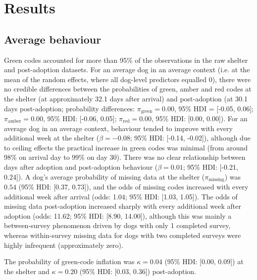 \documentclass[12pt]{article}
\begin{document}
\section{Results}

\subsection{Average behaviour}
Green codes accounted for more than 95\% of the observations in the raw shelter and post-adoption datasets. For an average dog in an average context (i.e. at the mean of the random effects, where all dog-level predictors equalled 0), there were no credible differences between the probabilities of green, amber and red codes at the shelter (at approximately 32.1 days after arrival) and post-adoption (at 30.1 days post-adoption; probability differences: $\pi_{\text{green}} = 0.00$, 95\% HDI = [-0.05, 0.06]; $\pi_{\text{amber}} = 0.00$, 95\% HDI: [-0.06, 0.05]; $\pi_{\text{red}} = 0.00$, 95\% HDI: [0.00, 0.00]). For an average dog in an average context, behaviour tended to improve with every additional week at the shelter ($\beta = -0.08$; 95\% HDI: [-0.14, -0.02]), although due to ceiling effects the practical increase in green codes was minimal (from around 98\% on arrival day to 99\% on day 30). There was no clear relationship between days after adoption and post-adoption behaviour ($\beta = 0.01$; 95\% HDI: [-0.21, 0.24]). A dog's average probability of missing data at the shelter ($\pi_{\text{missing}}$) was $0.54$ (95\% HDI: [0.37, 0.73]), and the odds of missing codes increased with every additional week after arrival (odds: 1.04; 95\% HDI: [1.03, 1.05]). The odds of missing data post-adoption increased sharply with every additional week after adoption (odds: 11.62; 95\% HDI: [8.90, 14.00]), although this was mainly a between-survey phenomenon driven by dogs with only 1 completed survey, whereas within-survey missing data for dogs with two completed surveys were highly infrequent (approximately zero).

The probability of green-code inflation was $\kappa = 0.04$ (95\% HDI: [0.00, 0.09]) at the shelter and $\kappa = 0.20$ (95\% HDI: [0.03, 0.36]) post-adoption.
\end{document}
